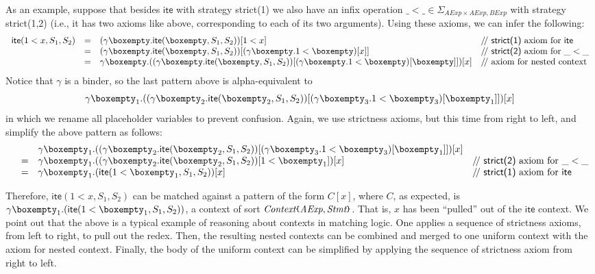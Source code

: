 \documentclass[UTF8,11pt]{article}
\theoremstyle{plain}
\theoremstyle{definition}
\theoremstyle{remark}
\newcommand{\Context}{\textit{Context}}
\newcommand{\hole}{\boxempty}
\newcommand{\AExp}{\textit{AExp}}
\newcommand{\BExp}{\textit{BExp}}
\newcommand{\Stmt}{\textit{Stmt}}
\newcommand{\ite}{\textsf{ite}}
\newcommand{\parametric}[2]{{#1}\raisebox{.2ex}{\texttt{\footnotesize{\{}}}#2\raisebox{.2ex}{\texttt{\footnotesize{\}}}}}
\newcommand{\doubleslash}{/\!/{ }}
\newcommand{\strict}[1]{\textsf{strict(#1)}}
\begin{document}
As an example, suppose that besides $\ite$ with strategy \textsf{strict(1)}
we also have an infix operation $\_<\_\in\Sigma_{\AExp\times\AExp,\BExp}$ with
strategy \textsf{strict(1,2)}
(i.e., it has two axioms like above, corresponding to each of its two
arguments).
Using these axioms, we can infer the following:
$$
\begin{array}{rcll}
\ite(1 < x,S_1,S_2) & = &
(\gamma \hole . \ite(\hole, S_1, S_2))[1 < x]
& \textrm{\doubleslash \strict{1} axiom for $\ite$}
\\
& = &
(\gamma \hole . \ite(\hole, S_1, S_2))[
(\gamma \hole . 1 < \hole)[x]
]
& \textrm{\doubleslash \strict{2} axiom for $\_<\_$}
\\
& = &
\gamma \hole . ((\gamma \hole . \ite(\hole, S_1, S_2))[
(\gamma \hole . 1 < \hole)[\hole]
])[x]
& \textrm{\doubleslash axiom for nested context}
\end{array}
$$
Notice that $\gamma$ is a binder,
so the last pattern above is alpha-equivalent to
$$
\gamma \hole_1 . ((\gamma \hole_2 . \ite(\hole_2, S_1, S_2))[
(\gamma \hole_3 . 1 < \hole_3)[\hole_1]
])[x]
$$
in which we rename all placeholder variables to prevent confusion.
Again, we use strictness axioms, but this time from right to left,
and simplify the above pattern as follows:
$$
\begin{array}{rcll}
& &
\gamma \hole_1 . ((\gamma \hole_2 . \ite(\hole_2, S_1, S_2))[
(\gamma \hole_3 . 1 < \hole_3)[\hole_1]
])[x]
\\
& = &
\gamma \hole_1 . ((\gamma \hole_2 . \ite(\hole_2, S_1, S_2))[
1 < \hole_1
])[x]
& \textrm{\doubleslash \strict{2} axiom for $\_<\_$}
\\
& = &
\gamma \hole_1 . (\ite(1 < \hole_1, S_1, S_2))[x]
& \textrm{\doubleslash \strict{1} axiom for \ite}
\end{array}
$$

Therefore, $\ite(1 < x,S_1,S_2)$ can be matched against a pattern
of the form $C[x]$, where $C$,
as expected, is $\gamma \hole_1 . (\ite(1 < \hole_1, S_1, S_2))$,
a context of sort $\parametric{\Context}{\AExp,\Stmt}$.
That is, $x$ has been ``pulled'' out of the $\ite$ context.
We point out that the above is a typical example of reasoning
about contexts in matching logic.
One applies a sequence of strictness axioms, from left to right,
to pull out the redex.
Then, the resulting nested contexts can be combined and merged
to one uniform context with the axiom for nested context.
Finally, the body of the uniform context can be simplified
by applying the sequence of strictness axiom from right to left.
\end{document}
